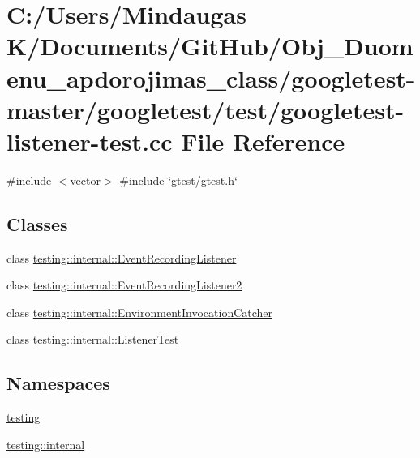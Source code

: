 \hypertarget{googletest-master_2googletest_2test_2googletest-listener-test_8cc}{}\section{C\+:/\+Users/\+Mindaugas K/\+Documents/\+Git\+Hub/\+Obj\+\_\+\+Duomenu\+\_\+apdorojimas\+\_\+class/googletest-\/master/googletest/test/googletest-\/listener-\/test.cc File Reference}
\label{googletest-master_2googletest_2test_2googletest-listener-test_8cc}
{\ttfamily \#include $<$vector$>$}\newline
{\ttfamily \#include \char`\"{}gtest/gtest.\+h\char`\"{}}\newline
\subsection*{Classes}
\begin{DoxyCompactItemize}
\item 
class \mbox{\hyperlink{classtesting_1_1internal_1_1_event_recording_listener}{testing\+::internal\+::\+Event\+Recording\+Listener}}
\item 
class \mbox{\hyperlink{classtesting_1_1internal_1_1_event_recording_listener2}{testing\+::internal\+::\+Event\+Recording\+Listener2}}
\item 
class \mbox{\hyperlink{classtesting_1_1internal_1_1_environment_invocation_catcher}{testing\+::internal\+::\+Environment\+Invocation\+Catcher}}
\item 
class \mbox{\hyperlink{classtesting_1_1internal_1_1_listener_test}{testing\+::internal\+::\+Listener\+Test}}
\end{DoxyCompactItemize}
\subsection*{Namespaces}
\begin{DoxyCompactItemize}
\item 
 \mbox{\hyperlink{namespacetesting}{testing}}
\item 
 \mbox{\hyperlink{namespacetesting_1_1internal}{testing\+::internal}}
\end{DoxyCompactItemize}
